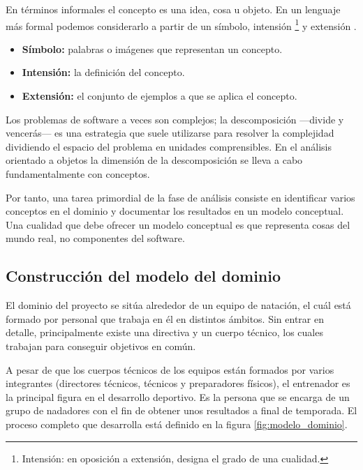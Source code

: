 	En términos informales el concepto es una idea, cosa u objeto. En un lenguaje más formal podemos considerarlo a partir de un símbolo, intensión \footnote{Intensión: en oposición a extensión, designa el grado de una cualidad.} y extensión \cite{MO95}.
	
	\begin{itemize}
		\item{{\bf Símbolo:} palabras o imágenes que representan un concepto.}
		\item{{\bf Intensión:} la definición del concepto.}
		\item{{\bf Extensión:} el conjunto de ejemplos a que se aplica el concepto.}
	\end{itemize}
	
	Los problemas de software a veces son complejos; la descomposición ---divide y vencerás--- es una estrategia que suele utilizarse para resolver la complejidad dividiendo el espacio del problema en unidades comprensibles. En el análisis orientado a objetos la dimensión de la descomposición se lleva a cabo fundamentalmente con conceptos.
		
	Por tanto, una tarea primordial de la fase de análisis consiste en identificar varios conceptos en el dominio y documentar los resultados en un modelo conceptual. Una cualidad que debe ofrecer un modelo conceptual es que representa cosas del mundo real, no componentes del software.
	

%
%
\subsection{Construcción del modelo del dominio} %
	\label{sub:construccion_del_modelo_del_dominio}

	El dominio del proyecto se sitúa alrededor de un equipo de natación, el cuál está formado por personal que trabaja en él en distintos ámbitos. Sin entrar en detalle, principalmente existe una directiva y un cuerpo técnico, los cuales trabajan para conseguir objetivos en común.  
	
	 A pesar de que los cuerpos técnicos de los equipos están formados por varios integrantes (directores técnicos, técnicos y preparadores físicos), el entrenador es la principal figura en el desarrollo deportivo. Es la persona que se encarga de un grupo de nadadores con el fin de obtener unos resultados a final de temporada. El proceso completo que desarrolla está definido en la figura \ref{fig:modelo_dominio}.
	
